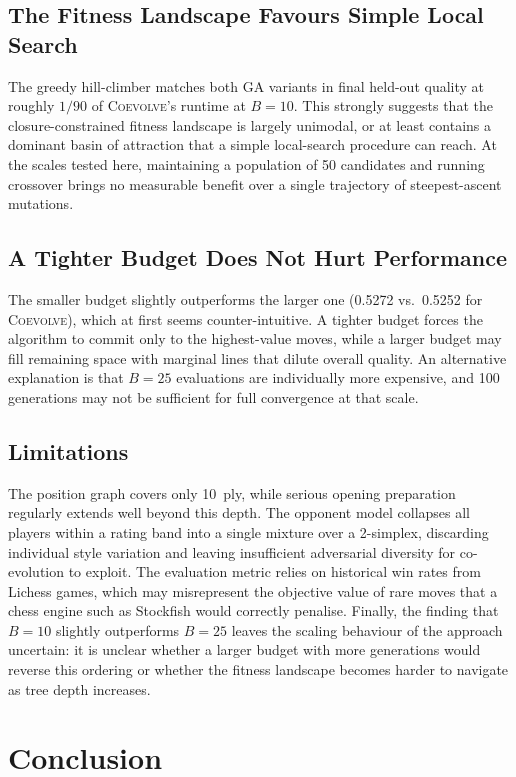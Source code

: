 \documentclass[conference]{IEEEtran}
\begin{document}
\subsection{The Fitness Landscape Favours Simple Local Search}
The greedy hill-climber matches both GA variants in final held-out quality
at roughly $1/90$ of \textsc{Coevolve}'s runtime at $B = 10$. This
strongly suggests that the closure-constrained fitness landscape is largely
unimodal, or at least contains a dominant basin of attraction that a simple
local-search procedure can reach. At the scales tested here, maintaining a
population of 50 candidates and running crossover brings no measurable
benefit over a single trajectory of steepest-ascent mutations.

\subsection{A Tighter Budget Does Not Hurt Performance}
The smaller budget slightly outperforms the larger one (0.5272 vs.\ 0.5252
for \textsc{Coevolve}), which at first seems counter-intuitive. A tighter
budget forces the algorithm to commit only to the highest-value moves, while
a larger budget may fill remaining space with marginal lines that dilute
overall quality. An alternative explanation is that $B = 25$ evaluations are
individually more expensive, and 100 generations may not be sufficient for
full convergence at that scale.

\subsection{Limitations}
The position graph covers only 10~ply, while serious opening preparation regularly extends well beyond this depth. The opponent model collapses all players within a rating band into a single mixture over a 2-simplex, discarding individual style variation and leaving insufficient adversarial diversity for co-evolution to exploit. The evaluation metric relies on historical win rates from Lichess games, which may misrepresent the objective value of rare moves that a chess engine such as Stockfish would correctly penalise. Finally, the finding that $B = 10$ slightly outperforms $B = 25$ leaves the scaling behaviour of the approach uncertain: it is unclear whether a larger budget with more generations would reverse this ordering or whether the fitness landscape becomes harder to navigate as tree depth increases.


\section{Conclusion}
\end{document}
